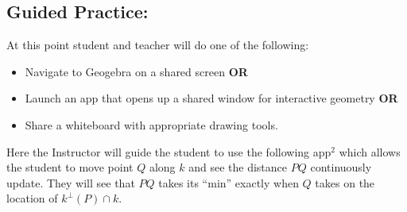 \documentclass{tufte-handout}
\begin{document}
\begin{tcolorbox}[enhanced jigsaw,breakable,pad at break*=1mm,attach boxed title to top center={yshift=-3mm,yshifttext=-1mm},
  colback=yellow!50!white,colframe=yellow,colbacktitle=red!80!black,
  title=Lesson Design Specifications (Please Read),fonttitle=\bfseries,
  boxed title style={size=small,colframe=red!50!black} ]
  \section{Guided Practice: }
 At this point student and teacher will do one of the following: 
    \begin{itemize}
      \item Navigate to Geogebra on a shared screen \textbf{OR}
      \item Launch an app that opens up a shared window for interactive geometry \textbf{OR}
      \item Share a whiteboard with appropriate drawing tools.
  \end{itemize}
  
Here the Instructor will guide the student to use the following app$^2$ which allows the student to move point $Q$ along $k$ and see the distance $PQ$ continuously update. They will see that $PQ$ takes its ``min'' exactly when $Q$ takes on the location of $k^{\perp}(P)\cap k.$ 
\begin{center}
\end{center}
\end{tcolorbox}
\end{document}
